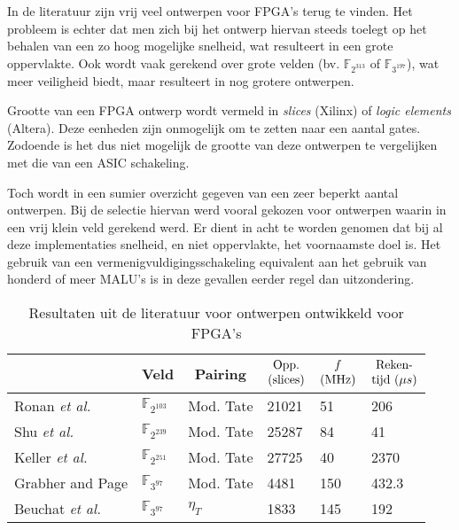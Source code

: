 In de literatuur zijn vrij veel ontwerpen voor FPGA's terug te vinden. Het probleem is echter dat men zich bij het ontwerp hiervan steeds toelegt op het behalen van een zo hoog mogelijke snelheid, wat resulteert in een grote oppervlakte. Ook wordt vaak gerekend over grote velden (bv. $\mathbb{F}_{2^{313}}$ of $\mathbb{F}_{3^{197}}$), wat meer veiligheid biedt, maar resulteert in nog grotere ontwerpen.

Grootte van een FPGA ontwerp wordt vermeld in \emph{slices} (Xilinx) of \emph{logic elements} (Altera). Deze eenheden zijn onmogelijk om te zetten naar een aantal gates. Zodoende is het dus niet mogelijk de grootte van deze ontwerpen te vergelijken met die van een ASIC schakeling.

Toch wordt in  een sumier overzicht gegeven van een zeer beperkt aantal ontwerpen. Bij de selectie hiervan werd vooral gekozen voor ontwerpen waarin in een vrij klein veld gerekend werd. Er dient in acht te worden genomen dat bij al deze implementaties snelheid, en niet oppervlakte, het voornaamste doel is. Het gebruik van een vermenigvuldigingsschakeling equivalent aan het gebruik van honderd of meer MALU's is in deze gevallen eerder regel dan uitzondering.

\begin{table}[h]
	\caption{Resultaten uit de literatuur voor ontwerpen ontwikkeld voor FPGA's}
	\label{tabel-resultaten-fpga}

	\centering
	\begin{tabular}{|l||l|l|l|l|l|}
		\hline
		&	\multicolumn{1}{c|}{Veld}	& \multicolumn{1}{c|}{Pairing}	& $\begin{array}{@{}c@{}}\text{Opp.}\\\text{(slices)}\end{array}$	& $\begin{array}{@{}c@{}}f\\\text{(MHz)}\end{array}$	& $\begin{array}{@{}c@{}}\text{Reken-}\\\text{tijd }(\mu s)\end{array}$\\
		\hline \hline
		Ronan \emph{et al.} \cite{ronan}	& $\mathbb{F}_{2^{103}}$	& Mod. Tate	& 21021	& 51	& 206\\ \hline
		Shu \emph{et al.} \cite{shu}		& $\mathbb{F}_{2^{239}}$	& Mod. Tate	& 25287	& 84	& 41\\ \hline
		Keller \emph{et al.} \cite{keller}		& $\mathbb{F}_{2^{251}}$	& Mod. Tate	& 27725	& 40	& 2370\\ \hline
		Grabher and Page \cite{grabher}	& $\mathbb{F}_{3^{97}}$		& Mod. Tate	& 4481	& 150	& 432.3\\ \hline
		Beuchat \emph{et al.} \cite{beuchat-eta}	& $\mathbb{F}_{3^{97}}$	& $\eta_T$	& 1833	& 145	& 192\\ \hline		
	\end{tabular}
\end{table}


